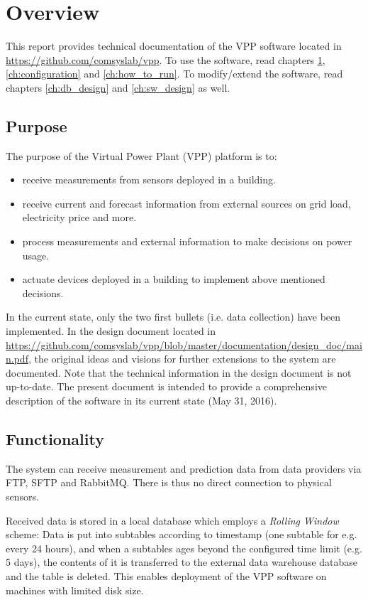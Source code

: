 \chapter{Overview} \label{ch:overview}

This report provides technical documentation of the VPP software located in \url{https://github.com/comsyslab/vpp}. To use the software, read chapters \ref{ch:overview}, \ref{ch:configuration} and \ref{ch:how_to_run}. To modify/extend the software, read chapters \ref{ch:db_design} and \ref{ch:sw_design} as well.

\section{Purpose}

The purpose of the Virtual Power Plant (VPP) platform is to:
\begin{itemize}

	\item receive measurements from sensors deployed in a building.
	\item receive current and forecast information from external sources on grid load, electricity price and more.
	\item process measurements and external information to make decisions on power usage.
	\item actuate devices deployed in a building to implement above mentioned decisions.
\end{itemize} 

In the current state, only the two first bullets (i.e. data collection) have been implemented. In the design document located in \url{https://github.com/comsyslab/vpp/blob/master/documentation/design_doc/main.pdf}, the original ideas and visions for further extensions to the system are documented. Note that the technical information in the design document is not up-to-date. The present document is intended to provide a comprehensive description of the software in its current state (May 31, 2016).

\section{Functionality}
The system can receive measurement and prediction data from data providers via FTP, SFTP and RabbitMQ. There is thus no direct connection to physical sensors. 

Received data is stored in a local database which employs a \emph{Rolling Window} scheme: Data is put into subtables according to timestamp (one subtable for e.g. every 24 hours), and when a subtables ages beyond the configured time limit (e.g. 5 days), the contents of it is transferred to the external data warehouse database and the table is deleted. This enables deployment of the VPP software on machines with limited disk size.

